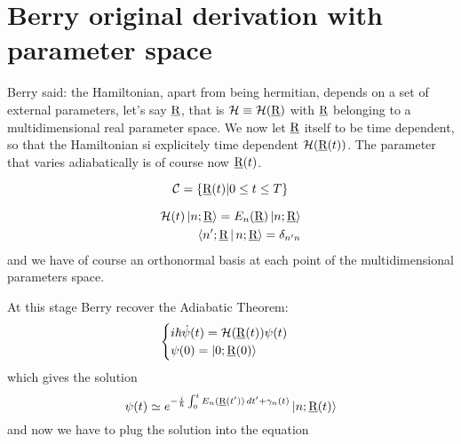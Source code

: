 \section{Berry original derivation with parameter space}
Berry said: the Hamiltonian, apart from being hermitian, depends on a set of external parameters, let's say $ \underline{\textrm{R}} $, that is $ \mathcal{H}\equiv\mathcal{H}(\underline{\textrm{R}}) $ with $ \underline{\textrm{R}} $ belonging to a multidimensional real parameter space. We now let $ \underline{\textrm{R}} $ itself to be time dependent, so that the Hamiltonian si explicitely time dependent $ \mathcal{H}(\underline{\textrm{R}}(t)) $. The parameter that varies adiabatically is of course now $ \underline{\textrm{R}}(t) $.


\begin{equation}
\mathcal{C}=\left\{\underline{\textrm{R}}(t)|0\leq t\leq T \right\}
\end{equation}

\begin{align}
\mathcal{H}(t)\Ket{n;\underline{\textrm{R}}}=E_n(\underline{\textrm{R}})\Ket{n;\underline{\textrm{R}}}\\
\Braket{n';\underline{\textrm{R}}|n;\underline{\textrm{R}}}=\delta_{n'n}
\end{align}
and we have of course an orthonormal basis at each point of the multidimensional parameters space.

At this stage Berry recover the Adiabatic Theorem:
\begin{equation}
\begin{cases}
i\hbar\dot{\psi}(t)=\mathcal{H}(\underline{\textrm{R}}(t))\psi(t)\\
\psi(0)=\Ket{0;\underline{\textrm{R}}(0)}
\end{cases}
\end{equation}
which gives the solution
\begin{equation}
\psi(t)\simeq e^{-\frac{i}{\hbar}\int_{0}^{t}E_n(\underline{\textrm{R}}(t'))\mathop{}\!d t'+\gamma_n(t)}\Ket{n;\underline{\textrm{R}}(t)}
\end{equation}
and now we have to plug the solution into the \Sch equation